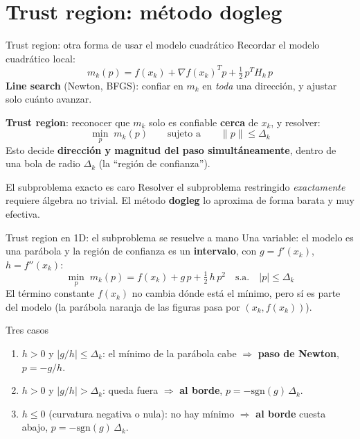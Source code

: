 \documentclass[aspectratio=169]{beamer}
\newcommand{\grad}{\nabla}
\begin{document}
\section{Trust region: m\'etodo dogleg}

\begin{frame}{Trust region: otra forma de usar el modelo cuadr\'atico}
  Recordar el modelo cuadr\'atico local:
  \[ m_k(p) = f(x_k) + \grad f(x_k)^T p + \tfrac12\, p^T H_k\, p \]
  \textbf{Line search} (Newton, BFGS): confiar en $m_k$ en \emph{toda} una direcci\'on, y ajustar solo cu\'anto avanzar.

  \textbf{Trust region}: reconocer que $m_k$ solo es confiable \textbf{cerca} de $x_k$, y resolver:
  \[ \min_{p} \; m_k(p) \qquad \text{sujeto a} \qquad \|p\| \leq \Delta_k \]
  Esto decide \textbf{direcci\'on y magnitud del paso simult\'aneamente}, dentro de una bola de radio $\Delta_k$ (la ``regi\'on de confianza'').

  \begin{alertblock}{El subproblema exacto es caro}
    Resolver el subproblema restringido \emph{exactamente} requiere \'algebra no trivial. El m\'etodo \textbf{dogleg} lo aproxima de forma barata y muy efectiva.
  \end{alertblock}
\end{frame}

\begin{frame}{Trust region en 1D: el subproblema se resuelve a mano}
  \small
  Una variable: el modelo es una par\'abola y la regi\'on de confianza es un \textbf{intervalo}, con $g=f'(x_k)$, $h=f''(x_k)$:
  \[ \min_{p}\; m_k(p) = f(x_k) + g\,p + \tfrac12\, h\, p^2 \quad \text{s.a.} \quad |p| \leq \Delta_k \]
  El t\'ermino constante $f(x_k)$ no cambia d\'onde est\'a el m\'inimo, pero s\'i es parte del modelo (la par\'abola naranja de las figuras pasa por $(x_k,f(x_k))$).
  \begin{block}{Tres casos}
    \begin{enumerate}
      \item $h>0$ y $|g/h|\leq\Delta_k$: el m\'inimo de la par\'abola cabe $\Rightarrow$ \textbf{paso de Newton}, $p=-g/h$.
      \item $h>0$ y $|g/h|>\Delta_k$: queda fuera $\Rightarrow$ \textbf{al borde}, $p=-\mathrm{sgn}(g)\,\Delta_k$.
      \item $h\leq0$ (curvatura negativa o nula): no hay m\'inimo $\Rightarrow$ \textbf{al borde} cuesta abajo, $p=-\mathrm{sgn}(g)\,\Delta_k$.
    \end{enumerate}
  \end{block}
\end{frame}
\end{document}
